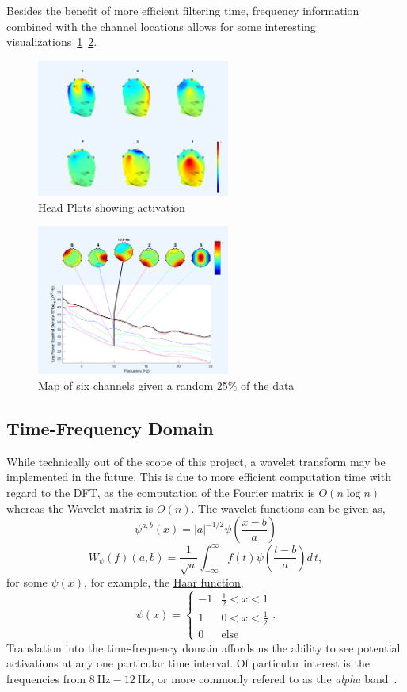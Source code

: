 \documentclass[twoside, 12pt]{article}
\theoremstyle{plain}
\begin{document}
Besides the benefit of more efficient filtering time, frequency information combined with the channel locations allows for some interesting visualizations~\ref{fig:HeadPlot}~\ref{fig:Freq}.

\begin{figure}[ht]
  \centering
  \includegraphics[width=2.5in]{HeadPlot.png}
  \caption{Head Plots showing activation}
  \label{fig:HeadPlot}
\end{figure}

\begin{figure}[ht]
  \centering
  \includegraphics[width=2.5in]{Frequency.png}
  \caption{Map of six channels given a random 25\% of the data}
  \label{fig:Freq}
  \end{figure}
\subsection{Time-Frequency Domain}
While technically out of the scope of this project, a wavelet transform may be implemented in the future. This is due to more efficient computation time with regard to the DFT, as the computation of the Fourier matrix is $O(n\log{n})$~\cite{shwartz_ica_2004} whereas the Wavelet matrix is $O(n)$. The wavelet functions can be given as,
$$\psi^{a,b}(x)=\left\vert a\right\vert^{-1/2}\psi \left(\frac{x-b}{a}\right)$$
$$W_{\psi}(f)(a,b)=\frac{1}{\sqrt{a}}\int_{-\infty}^{\infty}f(t)\psi \left(\frac{t-b}{a}\right)d\,t,$$
for some $\psi(x)$, for example, the \href{http://mathworld.wolfram.com/HaarFunction.html}{Haar function},
$$\psi(x)=\begin{cases}
 -1 & \frac{1}{2}<x<1 \\
 1 & 0<x<\frac{1}{2} \\
 0 & \text{else}
\end{cases}.$$
Translation into the time-frequency domain affords us the ability to see potential activations at any one particular time interval. Of particular interest is the frequencies from $\SI{8}{\hertz}-\SI{12}{\hertz}$, or more commonly refered to as the \textit{alpha} band~\cite{czarnowski_patients_2018}.
\end{document}
